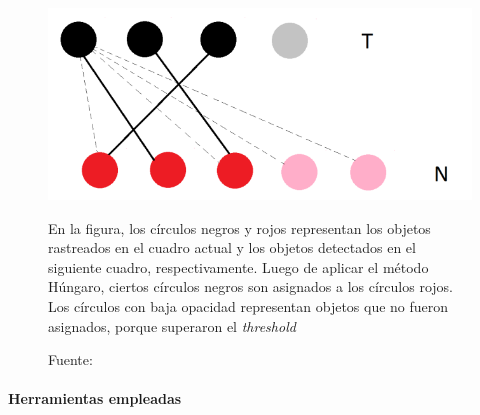 \documentclass[a4paper,openright,12pt]{report}
\begin{document}
\begin{figure}[H]
  \centering
    \includegraphics[width=1.0\columnwidth]{../images/hungarian-1.png}\par
  \caption{En la figura, los círculos negros y rojos representan los objetos
    rastreados en el cuadro actual y los objetos detectados en el siguiente
    cuadro, respectivamente. Luego de aplicar el método Húngaro, ciertos
    círculos negros son asignados a los círculos rojos. Los círculos con baja
    opacidad representan objetos que no fueron asignados, porque superaron el
    \textit{threshold}}
  \caption*{Fuente: \cite{szHucs2015svm}}
  \label{fig:hungarian-diagram-1}
\end{figure}

\paragraph{Herramientas empleadas}\mbox{} \\
\end{document}
